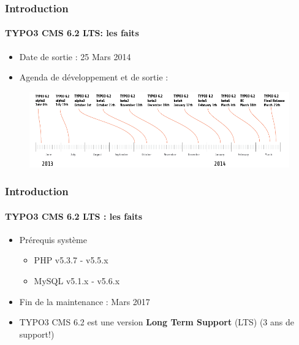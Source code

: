 \begin{frame}[fragile]
	\frametitle{Introduction}
	\framesubtitle{TYPO3 CMS 6.2 LTS: les faits}

	\begin{itemize}
		\item Date de sortie : 25 Mars 2014
		\item Agenda de développement et de sortie :
	\end{itemize}

	\begin{figure}
		\includegraphics[width=0.99\linewidth]{Images/Introduction/ReleaseTimeline.png}
	\end{figure}

\end{frame}


\begin{frame}[fragile]
	\frametitle{Introduction}
	\framesubtitle{TYPO3 CMS 6.2 LTS : les faits}

	\begin{itemize}
		\item Prérequis système
		\begin{itemize}
			\item PHP	\tabto{1.2cm} v5.3.7 - v5.5.x
			\item MySQL	\tabto{1.2cm} v5.1.x - v5.6.x
		\end{itemize}
	\end{itemize}

	\begin{itemize}
		\item Fin de la maintenance : Mars 2017
		\item TYPO3 CMS 6.2 est une version \textbf{Long Term Support} (LTS) (3 ans de support!)
	\end{itemize}

\end{frame}

